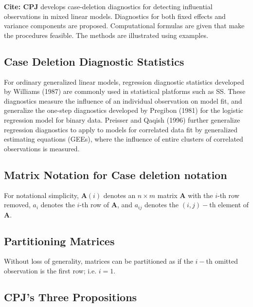 \documentclass[12pt, a4paper]{article}
\theoremstyle{plain}
\theoremstyle{definition}
\theoremstyle{remark}
\begin{document}
\textbf{Cite: CPJ} develops case-deletion diagnostics for detecting influential observations in mixed linear models. Diagnostics for both fixed effects and variance components are proposed. Computational formulas are given that make the procedures feasible. The methods are illustrated using examples. 

\subsection{Case Deletion Diagnostic Statistics}

For ordinary generalized linear models, regression diagnostic statistics developed by Williams (1987) are commonly used in statistical platforms such as SS. These diagnostics measure the influence of an individual observation on model fit, and generalize the one-step diagnostics developed by Pregibon (1981) for the logistic regression model for binary data.
Preisser and Qaqish (1996) further generalize regression diagnostics to apply to models for correlated data fit by generalized estimating equations (GEEs), where the influence of entire clusters of correlated observations is measured.


\subsection{Matrix Notation for  Case deletion notation} %

For notational simplicity, $\boldsymbol{A}(i)$ denotes an $n \times m$ matrix $\boldsymbol{A}$ with the $i$-th row
removed, $a_i$ denotes the $i$-th row of $\boldsymbol{A}$, and $a_{ij}$ denotes the $(i, j)-$th element of $\boldsymbol{A}$.

\subsection{Partitioning Matrices} %
Without loss of generality, matrices can be partitioned as if the $i-$th omitted observation is the first row; i.e. $i=1$.

\newpage
\subsection{CPJ's Three Propositions} %
\end{document}
